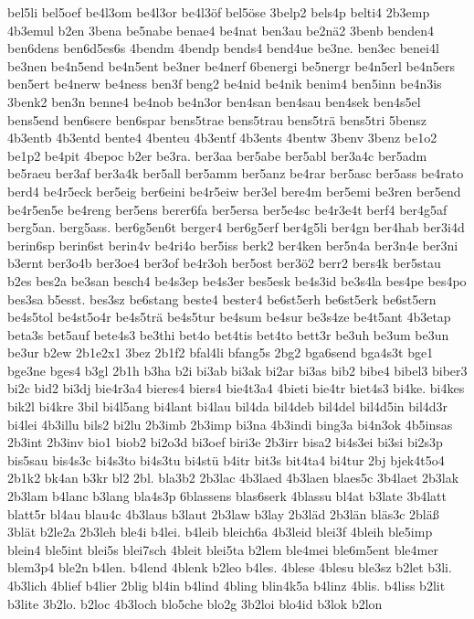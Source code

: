 {bel5li
bel5oef
be4l3om
be4l3or
be4l3öf
bel5öse
3belp2
bels4p
belti4
2b3emp
4b3emul
b2en
3bena
be5nabe
benae4
be4nat
ben3au
be2nä2
3benb
benden4
ben6dens
ben6d5es6s
4bendm
4bendp
bends4
bend4ue
be3ne.
ben3ec
benei4l
be3nen
be4n5end
be4n5ent
be3ner
be4nerf
6benergi
be5nergr
be4n5erl
be4n5ers
ben5ert
be4nerw
be4ness
ben3f
beng2
be4nid
be4nik
benim4
ben5inn
be4n3is
3benk2
ben3n
benne4
be4nob
be4n3or
ben4san
ben4sau
ben4sek
ben4s5el
bens5end
ben6sere
ben6spar
bens5trae
bens5trau
bens5trä
bens5tri
5bensz
4b3entb
4b3entd
bente4
4benteu
4b3entf
4b3ents
4bentw
3benv
3benz
be1o2
be1p2
be4pit
4bepoc
b2er
be3ra.
ber3aa
ber5abe
ber5abl
ber3a4c
ber5adm
be5raeu
ber3af
ber3a4k
ber5all
ber5amm
ber5anz
be4rar
ber5asc
ber5ass
be4rato
berd4
be4r5eck
ber5eig
ber6eini
be4r5eiw
ber3el
bere4m
ber5emi
be3ren
ber5end
be4r5en5e
be4reng
ber5ens
berer6fa
ber5ersa
ber5e4sc
be4r3e4t
berf4
ber4g5af
berg5an.
berg5ass.
ber6g5en6t
berger4
ber6g5erf
ber4g5li
ber4gn
ber4hab
ber3i4d
berin6sp
berin6st
berin4v
be4ri4o
ber5iss
berk2
ber4ken
ber5n4a
ber3n4e
ber3ni
b3ernt
ber3o4b
ber3oe4
ber3of
be4r3oh
ber5ost
ber3ö2
berr2
bers4k
ber5stau
b2es
bes2a
be3san
besch4
be4s3ep
be4s3er
bes5esk
be4s3id
be3s4la
bes4pe
bes4po
bes3sa
b5esst.
bes3sz
be6stang
beste4
bester4
be6st5erh
be6st5erk
be6st5ern
be4s5tol
be4st5o4r
be4s5trä
be4s5tur
be4sum
be4sur
be3s4ze
be4t5ant
4b3etap
beta3s
bet5auf
bete4s3
be3thi
bet4o
bet4tis
bet4to
bett3r
be3uh
be3um
be3un
be3ur
b2ew
2b1e2x1
3bez
2b1f2
bfal4li
bfang5s
2bg2
bga6send
bga4s3t
bge1
bge3ne
bges4
b3gl
2b1h
b3ha
b2i
bi3ab
bi3ak
bi2ar
bi3as
bib2
bibe4
bibel3
biber3
bi2c
bid2
bi3dj
bie4r3a4
bieres4
biers4
bie4t3a4
4bieti
bie4tr
biet4s3
bi4ke.
bi4kes
bik2l
bi4kre
3bil
bi4l5ang
bi4lant
bi4lau
bil4da
bil4deb
bil4del
bil4d5in
bil4d3r
bi4lei
4b3illu
bils2
bi2lu
2b3imb
2b3imp
bi3na
4b3indi
bing3a
bi4n3ok
4b5insas
2b3int
2b3inv
bio1
biob2
bi2o3d
bi3oef
biri3e
2b3irr
bisa2
bi4s3ei
bi3si
bi2s3p
bis5sau
bis4s3c
bi4s3to
bi4s3tu
bi4stü
b4itr
bit3s
bit4ta4
bi4tur
2bj
bjek4t5o4
2b1k2
bk4an
b3kr
bl2
2bl.
bla3b2
2b3lac
4b3laed
4b3laen
blaes5c
3b4laet
2b3lak
2b3lam
b4lanc
b3lang
bla4s3p
6blassens
blas6serk
4blassu
bl4at
b3late
3b4latt
blatt5r
bl4au
blau4c
4b3laus
b3laut
2b3law
b3lay
2b3läd
2b3län
bläs3c
2bläß
3blät
b2le2a
2b3leh
ble4i
b4lei.
b4leib
bleich6a
4b3leid
blei3f
4bleih
ble5imp
blein4
ble5int
blei5s
blei7sch
4bleit
blei5ta
b2lem
ble4mei
ble6m5ent
ble4mer
blem3p4
ble2n
b4len.
b4lend
4blenk
b2leo
b4les.
4blese
4blesu
ble3sz
b2let
b3li.
4b3lich
4blief
b4lier
2blig
bl4in
b4lind
4bling
blin4k5a
b4linz
4blis.
b4liss
b2lit
b3lite
3b2lo.
b2loc
4b3loch
blo5che
blo2g
3b2loi
blo4id
b3lok
b2lon
}
